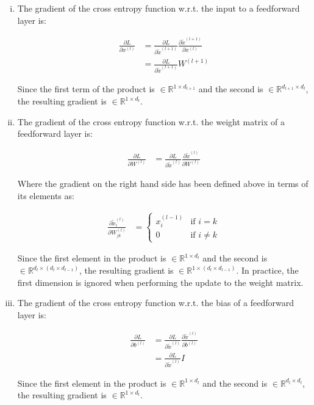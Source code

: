 \documentclass{article}
\begin{document}
\begin{enumerate}[i.]
  \item The gradient of the cross entropy function w.r.t. the input to a feedforward layer is:

  \begin{align*}
    \frac{\partial L}{\partial x^{(l)}} &= \frac{\partial L}{\partial \tilde{x}^{(l+1)}} \frac{\partial \tilde{x}^{(l+1)}}{\partial x^{(l)}} \\
    &= \frac{\partial L}{\partial \tilde{x}^{(l+1)}} W^{(l+1)}
  \end{align*}

  Since the first term of the product is $\in \mathbb{R}^{1 \times d_{l+1}}$ and the second is $\in \mathbb{R}^{d_{l+1} \times d_l}$, the resulting gradient is $\in \mathbb{R}^{1 \times d_l}$.

  \item The gradient of the cross entropy function w.r.t. the weight matrix of a feedforward layer is:

  \begin{align*}
    \frac{\partial L}{\partial W^{(l)}} &= \frac{\partial L}{\partial \tilde{x}^{(l)}} \frac{\partial \tilde{x}^{(l)}}{\partial W^{(l)}}
  \end{align*}

  Where the gradient on the right hand side has been defined above in terms of its elements as:

  \begin{align*}
    \frac{\partial \tilde{x}_i^{(l)}}{\partial W_{jk}^{(l)}} &=
    \begin{cases}
      x_i^{(l-1)} & \text{if } i = k \\
      0 & \text{if } i \neq k
    \end{cases}
  \end{align*}

  Since the first element in the product is $\in \mathbb{R}^{1 \times d_l}$ and the second is $\in \mathbb{R}^{d_l \times (d_l \times d_{l-1})}$, the resulting gradient is $\in \mathbb{R}^{1 \times (d_l \times d_{l-1})}$. In practice, the first dimension is ignored when performing the update to the weight matrix.

  \item The gradient of the cross entropy function w.r.t. the bias of a feedforward layer is:

  \begin{align*}
    \frac{\partial L}{\partial b^{(l)}} &= \frac{\partial L}{\partial \tilde{x}^{(l)}} \frac{\partial \tilde{x}^{(l)}}{\partial b^{(l)}} \\
    &= \frac{\partial L}{\partial \tilde{x}^{(l)}} I
  \end{align*}

  Since the first element in the product is $\in \mathbb{R}^{1 \times d_l}$ and the second is $\in \mathbb{R}^{d_l \times d_l}$, the resulting gradient is $\in \mathbb{R}^{1 \times d_l}$.

\end{enumerate}
\end{document}
